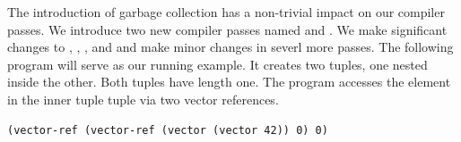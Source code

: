\documentclass[11pt]{book}
\newtheorem{exercise}[theorem]{Exercise}
\begin{document}



The introduction of garbage collection has a non-trivial impact on our
compiler passes. We introduce two new compiler passes named
 and . We make
significant changes to ,
, , and
 and make minor changes in severl more passes.  The
following program will serve as our running example.  It creates two
tuples, one nested inside the other. Both tuples have length one. The
program accesses the element in the inner tuple tuple via two vector
references.
\begin{lstlisting}
(vector-ref (vector-ref (vector (vector 42)) 0) 0)
\end{lstlisting}
\end{document}
